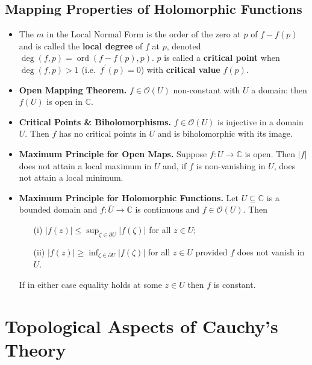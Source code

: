 \documentclass{article}
\DeclareMathOperator{\order}{ord}
\DeclareMathOperator{\degree}{deg}
\newenvironment{topic}[1]{%
{\subsection{#1}}%
\begin{itemize}%
}{%
\end{itemize}%
}
\newcommand{\theorem}[1]{\item {\bf #1.}}
\newcommand{\corollary}[1]{\item {\bf #1.}}
\newcommand{\term}[1]{{\bf #1}}
\newcommand{\holo}[1]{\mathcal{O}(#1)}
\newcommand{\remark}{\item}
\begin{document}
\begin{topic}{Mapping Properties of Holomorphic Functions}
\remark The $m$ in the Local Normal Form is the order of the zero at $p$ of $f - f(p)$ and is called the \term{local degree} of $f$ at $p$, denoted $\degree(f, p) = \order(f - f(p), p)$. $p$ is called a \term{critical point} when $\degree(f, p) > 1$ (i.e.\ $f^\prime(p) = 0$) with \term{critical value} $f(p)$.

\theorem{Open Mapping Theorem} $f \in \holo{U}$ non-constant with $U$ a domain: then $f(U)$ is open in $\mathbb{C}$.

\corollary{Critical Points \& Biholomorphisms} $f \in \holo{U}$ is injective in a domain $U$. Then $f$ has no critical points in $U$ and is biholomorphic with its image.

\theorem{Maximum Principle for Open Maps} Suppose $f : U \to \mathbb{C}$ is open. Then $|f|$ does not attain a local maximum in $U$ and, if $f$ is non-vanishing in $U$, does not attain a local minimum.

\theorem{Maximum Principle for Holomorphic Functions} Let $U \subseteq \mathbb{C}$ is a bounded domain and $f : \overline{U} \to \mathbb{C}$ is continuous and $f \in \holo{U}$. Then
\begin{enumerate}
\item[(i)] $|f(z)| \leq \sup_{\zeta \in \partial U} |f(\zeta)|$ for all $z \in U$;
\item[(ii)] $|f(z)| \geq \inf_{\zeta \in \partial U} |f(\zeta)|$ for all $z \in U$ provided $f$ does not vanish in $U$.
\end{enumerate}
If in either case equality holds at some $z \in U$ then $f$ is constant.

\end{topic}

\newpage
\section{Topological Aspects of Cauchy's Theory}
\end{document}
